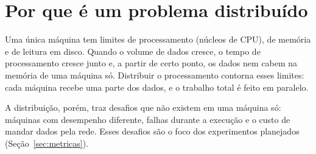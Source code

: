 \section{Por que é um problema distribuído}

Uma única máquina tem limites de processamento (núcleos de CPU), de memória
e de leitura em disco. Quando o volume de dados cresce, o tempo de
processamento cresce junto e, a partir de certo ponto, os dados nem cabem
na memória de uma máquina só. Distribuir o processamento contorna esses
limites: cada máquina recebe uma parte dos dados, e o trabalho total é
feito em paralelo.

A distribuição, porém, traz desafios que não existem em uma máquina só:
máquinas com desempenho diferente, falhas durante a execução e o custo de
mandar dados pela rede. Esses desafios são o foco dos experimentos
planejados (Seção~\ref{sec:metricas}).
